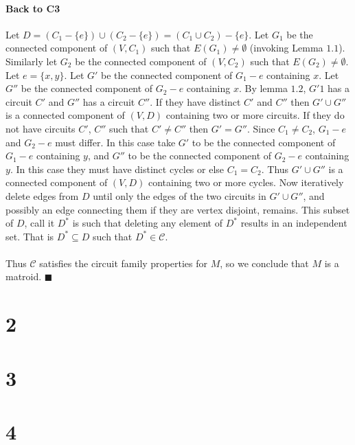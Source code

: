 \documentclass[letterpaper,12pt,oneside,onecolumn]{report}
\begin{document}
\paragraph{Back to C3}
Let $D = (C_1 - \{e\}) \cup (C_2 - \{e\}) = (C_1 \cup C_2) - \{e\}$. Let $G_1$ be the connected component of $(V,C_1)$ such that $E(G_1) \neq \emptyset$ (invoking Lemma $1.1$). Similarly let $G_2$ be the connected component of $(V,C_2)$ such that $E(G_2) \neq \emptyset$. Let $e = \{x,y\}$. Let $G'$ be the connected component of $G_1 - e$ containing $x$. Let $G''$ be the connected component of $G_2 - e$ containing $x$. By lemma $1.2$, $G'1$ has a circuit $C'$ and $G''$ has a circuit $C''$. If they have distinct $C'$ and $C''$ then $G' \cup G''$ is a connected component of $(V,D)$ containing two or more circuits. If they do not have circuits $C'$, $C''$ such that $C' \neq C''$ then $G' = G''$. Since $C_1 \neq C_2$, $G_1 - e$ and $G_2 - e$ must differ. In this case take $G'$ to be the connected component of $G_1 - e$ containing $y$, and $G''$ to be the connected component of $G_2 -e$ containing $y$. In this case they must have distinct cycles or else $C_1 = C_2$. Thus $G' \cup G''$ is a connected component of $(V,D)$ containing two or more cycles. Now iteratively delete edges from $D$ until only the edges of the two circuits in $G' \cup G''$, and possibly an edge connecting them if they are vertex disjoint, remains. This subset of $D$, call it $D^*$ is such that deleting any element of $D^*$ results in an independent set. That is $D^* \subseteq D$ such that $D^* \in \mathcal{C}$.
\paragraph{}
Thus $\mathcal{C}$ satisfies the circuit family properties for $M$, so we conclude that $M$ is a matroid. $\blacksquare$
\section*{2}
\section*{3}
\section*{4}
\end{document}
